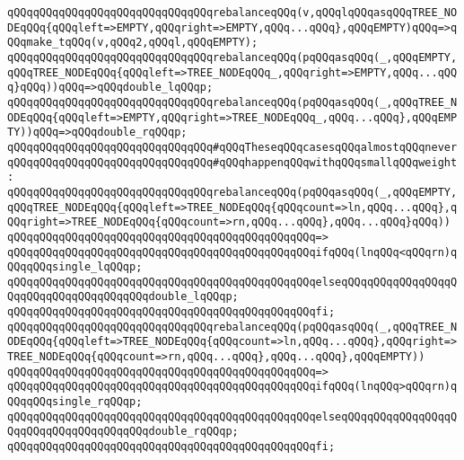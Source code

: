 \verb|qQQqqQQqqQQqqQQqqQQqqQQqqQQqqQQqrebalanceqQQq(v,qQQqlqQQqasqQQqTREE_NODEqQQq{qQQqleft=>EMPTY,qQQqright=>EMPTY,qQQq...qQQq},qQQqEMPTY)qQQq=>qQQqmake_tqQQq(v,qQQq2,qQQql,qQQqEMPTY);|\newline
\newline
\verb|qQQqqQQqqQQqqQQqqQQqqQQqqQQqqQQqrebalanceqQQq(pqQQqasqQQq(_,qQQqEMPTY,qQQqTREE_NODEqQQq{qQQqleft=>TREE_NODEqQQq_,qQQqright=>EMPTY,qQQq...qQQq}qQQq))qQQq=>qQQqdouble_lqQQqp;|\newline
\verb|qQQqqQQqqQQqqQQqqQQqqQQqqQQqqQQqrebalanceqQQq(pqQQqasqQQq(_,qQQqTREE_NODEqQQq{qQQqleft=>EMPTY,qQQqright=>TREE_NODEqQQq_,qQQq...qQQq},qQQqEMPTY))qQQq=>qQQqdouble_rqQQqp;|\newline
\newline
\verb|qQQqqQQqqQQqqQQqqQQqqQQqqQQqqQQq#qQQqTheseqQQqcasesqQQqalmostqQQqnever|\newline
\verb|qQQqqQQqqQQqqQQqqQQqqQQqqQQqqQQq#qQQqhappenqQQqwithqQQqsmallqQQqweight:|\newline
\newline
\verb|qQQqqQQqqQQqqQQqqQQqqQQqqQQqqQQqrebalanceqQQq(pqQQqasqQQq(_,qQQqEMPTY,qQQqTREE_NODEqQQq{qQQqleft=>TREE_NODEqQQq{qQQqcount=>ln,qQQq...qQQq},qQQqright=>TREE_NODEqQQq{qQQqcount=>rn,qQQq...qQQq},qQQq...qQQq}qQQq))|\newline
\verb|qQQqqQQqqQQqqQQqqQQqqQQqqQQqqQQqqQQqqQQqqQQqqQQq=>|\newline
\verb|qQQqqQQqqQQqqQQqqQQqqQQqqQQqqQQqqQQqqQQqqQQqqQQqifqQQq(lnqQQq<qQQqrn)qQQqqQQqsingle_lqQQqp;|\newline
\verb|qQQqqQQqqQQqqQQqqQQqqQQqqQQqqQQqqQQqqQQqqQQqqQQqelseqQQqqQQqqQQqqQQqqQQqqQQqqQQqqQQqqQQqqQQqdouble_lqQQqp;|\newline
\verb|qQQqqQQqqQQqqQQqqQQqqQQqqQQqqQQqqQQqqQQqqQQqqQQqfi;|\newline
\newline
\verb|qQQqqQQqqQQqqQQqqQQqqQQqqQQqqQQqrebalanceqQQq(pqQQqasqQQq(_,qQQqTREE_NODEqQQq{qQQqleft=>TREE_NODEqQQq{qQQqcount=>ln,qQQq...qQQq},qQQqright=>TREE_NODEqQQq{qQQqcount=>rn,qQQq...qQQq},qQQq...qQQq},qQQqEMPTY))|\newline
\verb|qQQqqQQqqQQqqQQqqQQqqQQqqQQqqQQqqQQqqQQqqQQqqQQq=>|\newline
\verb|qQQqqQQqqQQqqQQqqQQqqQQqqQQqqQQqqQQqqQQqqQQqqQQqifqQQq(lnqQQq>qQQqrn)qQQqqQQqsingle_rqQQqp;|\newline
\verb|qQQqqQQqqQQqqQQqqQQqqQQqqQQqqQQqqQQqqQQqqQQqqQQqelseqQQqqQQqqQQqqQQqqQQqqQQqqQQqqQQqqQQqqQQqdouble_rqQQqp;|\newline
\verb|qQQqqQQqqQQqqQQqqQQqqQQqqQQqqQQqqQQqqQQqqQQqqQQqfi;|\newline
